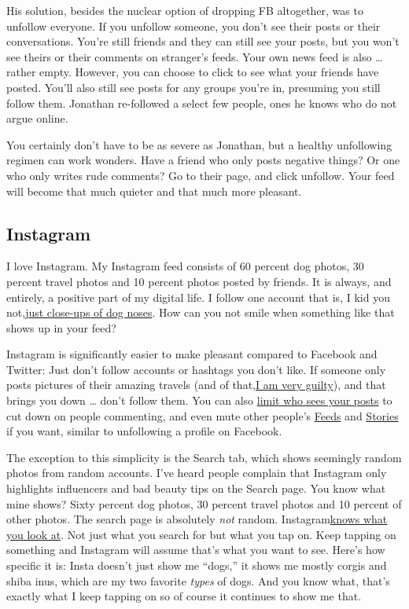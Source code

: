 His solution, besides the nuclear option of dropping FB altogether, was
to unfollow everyone. If you unfollow someone, you don't see their posts
or their conversations. You're still friends and they can still see your
posts, but you won't see theirs or their comments on stranger's feeds.
Your own news feed is also \ldots{} rather empty. However, you can
choose to click to see what your friends have posted. You'll also still
see posts for any groups you're in, presuming you still follow them.
Jonathan re-followed a select few people, ones he knows who do not argue
online.

You certainly don't have to be as severe as Jonathan, but a healthy
unfollowing regimen can work wonders. Have a friend who only posts
negative things? Or one who only writes rude comments? Go to their page,
and click unfollow. Your feed will become that much quieter and that
much more pleasant.

\hypertarget{instagram}{%
\subsection{Instagram}\label{instagram}}

I love Instagram. My Instagram feed consists of 60 percent dog photos,
30 percent travel photos and 10 percent photos posted by friends. It is
always, and entirely, a positive part of my digital life. I follow one
account that is, I kid you
not,\href{https://www.instagram.com/boopmynose}{just close-ups of dog
noses}. How can you not smile when something like that shows up in your
feed?

Instagram is significantly easier to make pleasant compared to Facebook
and Twitter: Just don't follow accounts or hashtags you don't like. If
someone only posts pictures of their amazing travels (and of
that,\href{https://www.instagram.com/inveterate_adventurer/}{I am very
guilty}), and that brings you down \ldots{} don't follow them. You can
also
\href{https://help.instagram.com/196883487377501/?helpref=hc_fnav\&bc\%5B0\%5D=Instagram\%20Help\&bc\%5B1\%5D=Managing\%20Your\%20Account}{limit
who sees your posts} to cut down on people commenting, and even mute
other people's
\href{https://instagram-press.com/blog/2018/05/22/introducing-mute/}{Feeds}
and \href{https://help.instagram.com/290238234687437}{Stories} if you
want, similar to unfollowing a profile on Facebook.

The exception to this simplicity is the Search tab, which shows
seemingly random photos from random accounts. I've heard people complain
that Instagram only highlights influencers and bad beauty tips on the
Search page. You know what mine shows? Sixty percent dog photos, 30
percent travel photos and 10 percent of other photos. The search page is
absolutely \emph{not} random.
Instagram\href{https://blog.hootsuite.com/instagram-algorithm/}{knows
what you look at}. Not just what you search for but what you tap on.
Keep tapping on something and Instagram will assume that's what you want
to see. Here's how specific it is: Insta doesn't just show me ``dogs,''
it shows me mostly corgis and shiba inus, which are my two favorite
\emph{types} of dogs. And you know what, that's exactly what I keep
tapping on so of course it continues to show me that.

